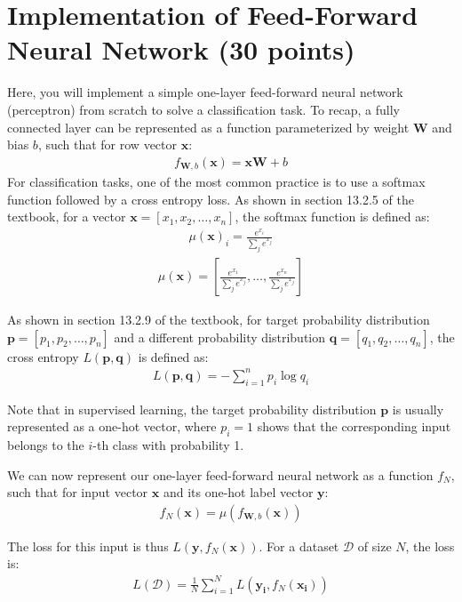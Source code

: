 \section{Implementation of Feed-Forward Neural Network (30 points) }
Here, you will implement a simple one-layer feed-forward neural network (perceptron) from scratch to solve a classification task. To recap, a fully connected layer can be represented as a function parameterized by weight $\mathbf{W}$ and bias $b$, such that for row vector $\mathbf{x}$:
\begin{align}
f_{\mathbf{W},b}(\mathbf{x}) = \mathbf{x}\mathbf{W} + b
\end{align}
For classification tasks, one of the most common practice is to use a softmax function followed by a cross entropy loss. As shown in section 13.2.5 of the textbook, for a vector $\mathbf{x}=[x_1, x_2, \dotsc, x_n]$, the softmax function is defined as:
\begin{align}
\mu (\mathbf{x})_i = \frac{e^{x_i}}{\sum_j e^{x_j}}
\end{align}
\begin{align}
\mu (\mathbf{x}) = \left[\frac{e^{x_1}}{\sum_j e^{x_j}}, \dotsc, \frac{e^{x_n}}{\sum_j e^{x_j}}\right]
\end{align}

As shown in section 13.2.9 of the textbook, for target probability distribution $\mathbf{p}=[p_1, p_2, \dotsc, p_n]$ and a different probability distribution $\mathbf{q}=[q_1, q_2, \dotsc, q_n]$, the cross entropy $L(\mathbf{p}, \mathbf{q})$ is defined as:
\begin{align}
L(\mathbf{p}, \mathbf{q}) = - \sum_{i=1}^{n} p_i \log q_i
\end{align}

Note that in supervised learning, the target probability distribution $\mathbf{p}$ is usually represented as a one-hot vector, where $p_i=1$ shows that the corresponding input belongs to the $i$-th class with probability 1.

We can now represent our one-layer feed-forward neural network as a function $f_N$, such that for input vector $\mathbf{x}$ and its one-hot label vector $\mathbf{y}$:
\begin{align}
f_N(\mathbf{x}) = \mu(f_{\mathbf{W},b}(\mathbf{x}))
\end{align}

The loss for this input is thus $L(\mathbf{y}, f_N(\mathbf{x}))$. For a dataset $\mathcal{D}$ of size $N$, the loss is:
\begin{align}
L(\mathcal{D}) = \frac{1}{N} \sum_{i=1}^N L(\mathbf{y_i}, f_N(\mathbf{x_i}))
\end{align}

